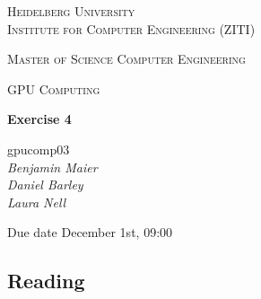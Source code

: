 \documentclass[12pt]{article}
\newcommand{\lecture}{GPU Computing}
\newcommand{\exercise}{Exercise 4}
\newcommand{\groupnumber}{gpucomp03}
\newcommand{\groupmemberslist}{Benjamin Maier\\Daniel Barley\\Laura Nell}
\newcommand{\duedate}{December 1st, 09:00}
\begin{document}
	\begin{titlepage}
		\centering

		{\scshape\LARGE Heidelberg University\\Institute for Computer Engineering (ZITI) \par}
		\vspace{1.5cm}
		{\scshape\Large Master of Science Computer Engineering \par}
		\vspace{0.5cm}
		{\scshape\Large \lecture \par}
		\vspace{1.5cm}
		{\huge\bfseries \exercise \par}
		\vspace{2cm}
		{\Large \groupnumber \itshape \\ \vspace{30pt} \groupmemberslist \par}
		\vfill
		
		
		{\large Due date \duedate \par}
	\end{titlepage}

\setcounter{section}{4}

\subsection{Reading}
\end{document}
